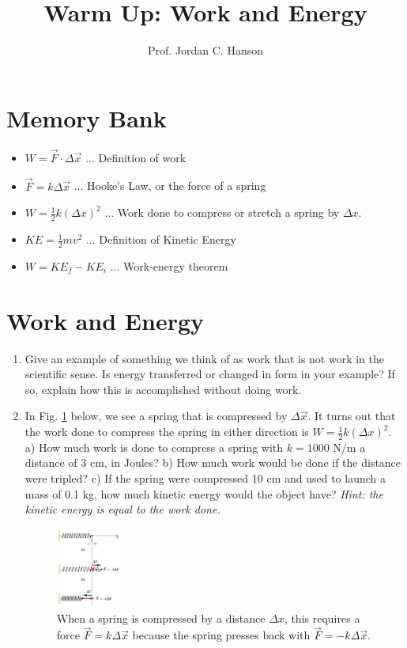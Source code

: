 \documentclass{article}
\begin{document}
\title{Warm Up: Work and Energy}
\author{Prof. Jordan C. Hanson}

\maketitle

\section{Memory Bank}

\begin{itemize}
\item $W = \vec{F} \cdot \Delta \vec{x}$ ... Definition of work
\item $\vec{F} = k\Delta \vec{x}$ ... Hooke's Law, or the force of a spring
\item $W = \frac{1}{2}k(\Delta x)^2$ ... Work done to compress or stretch a spring by $\Delta x$.
\item $KE = \frac{1}{2}m v^2$ ... Definition of Kinetic Energy
\item $W = KE_f - KE_i$ ... Work-energy theorem
\end{itemize}

\section{Work and Energy}

\begin{enumerate}
\item Give an example of something we think of as work that is not work in the scientific sense. Is energy transferred or changed in form in your example? If so, explain how this is accomplished without doing work. \\ \vspace{2cm}
\item In Fig. \ref{fig:work} below, we see a spring that is compressed by $\Delta \vec{x}$.  It turns out that the work done to compress the spring in either direction is $W = \frac{1}{2} k (\Delta x)^2$.  a) How much work is done to compress a spring with $k = 1000$ N/m a distance of 3 cm, in Joules?  b) How much work would be done if the distance were tripled?  c) If the spring were compressed 10 cm and used to launch a mass of 0.1 kg, how much kinetic energy would the object have? \textit{Hint: the kinetic energy is equal to the work done.}\\ \vspace{2cm}
\begin{figure}
\centering
\includegraphics[width=0.2\textwidth]{springWork.png}
\caption{\label{fig:work} When a spring is compressed by a distance $\Delta x$, this requires a force $\vec{F} = k\Delta \vec{x}$ because the spring presses back with $\vec{F} = -k\Delta \vec{x}$.}
\end{figure}
\end{enumerate}
\end{document}
